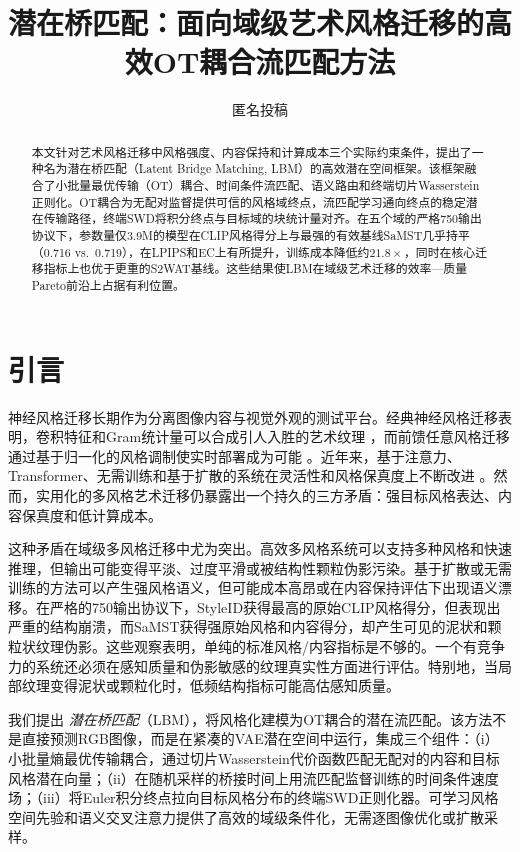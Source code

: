 \documentclass[letterpaper]{article}
\title{潜在桥匹配：面向域级艺术风格迁移的高效OT耦合流匹配方法}
\author{匿名投稿}
\begin{document}
\maketitle

\begin{abstract}
本文针对艺术风格迁移中风格强度、内容保持和计算成本三个实际约束条件，提出了一种名为潜在桥匹配（Latent Bridge Matching, LBM）的高效潜在空间框架。该框架融合了小批量最优传输（OT）耦合、时间条件流匹配、语义路由和终端切片Wasserstein正则化。OT耦合为无配对监督提供可信的风格域终点，流匹配学习通向终点的稳定潜在传输路径，终端SWD将积分终点与目标域的块统计量对齐。在五个域的严格750输出协议下，参数量仅3.9M的模型在CLIP风格得分上与最强的有效基线SaMST几乎持平（0.716 vs.\ 0.719），在LPIPS和EC上有所提升，训练成本降低约$21.8\times$，同时在核心迁移指标上也优于更重的S2WAT基线。这些结果使LBM在域级艺术迁移的效率—质量Pareto前沿上占据有利位置。
\end{abstract}

\section{引言}
神经风格迁移长期作为分离图像内容与视觉外观的测试平台。经典神经风格迁移表明，卷积特征和Gram统计量可以合成引人入胜的艺术纹理 \cite{gatys2016image}，而前馈任意风格迁移通过基于归一化的风格调制使实时部署成为可能 \cite{huang2017adain}。近年来，基于注意力、Transformer、无需训练和基于扩散的系统在灵活性和风格保真度上不断改进 \cite{park2019sanet,deng2022stytr2,hong2023aespa,huang2024aesfa,gim2024cast,chung2024styleid}。然而，实用化的多风格艺术迁移仍暴露出一个持久的三方矛盾：强目标风格表达、内容保真度和低计算成本。

这种矛盾在域级多风格迁移中尤为突出。高效多风格系统可以支持多种风格和快速推理，但输出可能变得平淡、过度平滑或被结构性颗粒伪影污染。基于扩散或无需训练的方法可以产生强风格语义，但可能成本高昂或在内容保持评估下出现语义漂移。在严格的750输出协议下，StyleID获得最高的原始CLIP风格得分，但表现出严重的结构崩溃，而SaMST获得强原始风格和内容得分，却产生可见的泥状和颗粒状纹理伪影。这些观察表明，单纯的标准风格/内容指标是不够的。一个有竞争力的系统还必须在感知质量和伪影敏感的纹理真实性方面进行评估。特别地，当局部纹理变得泥状或颗粒化时，低频结构指标可能高估感知质量。

我们提出 \emph{潜在桥匹配}（LBM），将风格化建模为OT耦合的潜在流匹配。该方法不是直接预测RGB图像，而是在紧凑的VAE潜在空间中运行，集成三个组件：（i）小批量熵最优传输耦合，通过切片Wasserstein代价函数匹配无配对的内容和目标风格潜在向量；（ii）在随机采样的桥接时间上用流匹配监督训练的时间条件速度场；（iii）将Euler积分终点拉向目标风格分布的终端SWD正则化器。可学习风格空间先验和语义交叉注意力提供了高效的域级条件化，无需逐图像优化或扩散采样。
\end{document}
